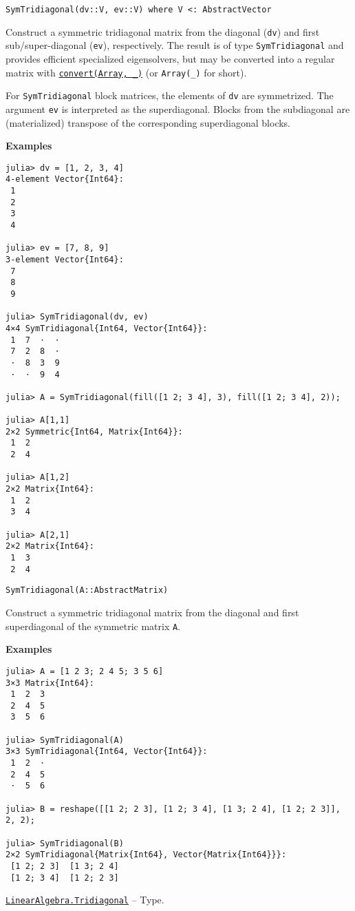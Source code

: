 \begin{adjustwidth}{2em}{0pt}


\begin{verbatim}
SymTridiagonal(dv::V, ev::V) where V <: AbstractVector
\end{verbatim}

Construct a symmetric tridiagonal matrix from the diagonal (\texttt{dv}) and first sub/super-diagonal (\texttt{ev}), respectively. The result is of type \texttt{SymTridiagonal} and provides efficient specialized eigensolvers, but may be converted into a regular matrix with \hyperlink{1846942650946171605}{\texttt{convert(Array, \_)}} (or \texttt{Array(\_)} for short).

For \texttt{SymTridiagonal} block matrices, the elements of \texttt{dv} are symmetrized. The argument \texttt{ev} is interpreted as the superdiagonal. Blocks from the subdiagonal are (materialized) transpose of the corresponding superdiagonal blocks.

\textbf{Examples}


\begin{verbatim}
julia> dv = [1, 2, 3, 4]
4-element Vector{Int64}:
 1
 2
 3
 4

julia> ev = [7, 8, 9]
3-element Vector{Int64}:
 7
 8
 9

julia> SymTridiagonal(dv, ev)
4×4 SymTridiagonal{Int64, Vector{Int64}}:
 1  7  ⋅  ⋅
 7  2  8  ⋅
 ⋅  8  3  9
 ⋅  ⋅  9  4

julia> A = SymTridiagonal(fill([1 2; 3 4], 3), fill([1 2; 3 4], 2));

julia> A[1,1]
2×2 Symmetric{Int64, Matrix{Int64}}:
 1  2
 2  4

julia> A[1,2]
2×2 Matrix{Int64}:
 1  2
 3  4

julia> A[2,1]
2×2 Matrix{Int64}:
 1  3
 2  4
\end{verbatim}




\begin{lstlisting}
SymTridiagonal(A::AbstractMatrix)
\end{lstlisting}

Construct a symmetric tridiagonal matrix from the diagonal and first superdiagonal of the symmetric matrix \texttt{A}.

\textbf{Examples}


\begin{verbatim}
julia> A = [1 2 3; 2 4 5; 3 5 6]
3×3 Matrix{Int64}:
 1  2  3
 2  4  5
 3  5  6

julia> SymTridiagonal(A)
3×3 SymTridiagonal{Int64, Vector{Int64}}:
 1  2  ⋅
 2  4  5
 ⋅  5  6

julia> B = reshape([[1 2; 2 3], [1 2; 3 4], [1 3; 2 4], [1 2; 2 3]], 2, 2);

julia> SymTridiagonal(B)
2×2 SymTridiagonal{Matrix{Int64}, Vector{Matrix{Int64}}}:
 [1 2; 2 3]  [1 3; 2 4]
 [1 2; 3 4]  [1 2; 2 3]
\end{verbatim}



\end{adjustwidth}
\hypertarget{17820886359515748171}{}
\hyperlink{17820886359515748171}{\texttt{LinearAlgebra.Tridiagonal}}  -- {Type.}

